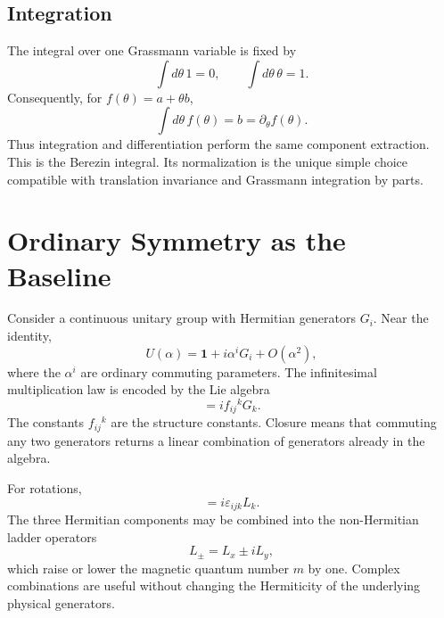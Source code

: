 \subsection{Integration}

The integral over one Grassmann variable is fixed by
\begin{equation}
\int d\theta\,1=0,
\qquad
\int d\theta\,\theta=1.
\end{equation}
Consequently, for \(f(\theta)=a+\theta b\),
\begin{equation}
\int d\theta\,f(\theta)=b=\partial_\theta f(\theta).
\end{equation}
Thus integration and differentiation perform the same component extraction. This is the Berezin integral. Its normalization is the unique simple choice compatible with translation invariance and Grassmann integration by parts. 

\section{Ordinary Symmetry as the Baseline}

Consider a continuous unitary group with Hermitian generators \(G_i\). Near the identity,
\begin{equation}
U(\alpha)=\mathbf 1+i\alpha^iG_i+O(\alpha^2),
\end{equation}
where the \(\alpha^i\) are ordinary commuting parameters. The infinitesimal multiplication law is encoded by the Lie algebra
\begin{equation}
[G_i,G_j]=i f_{ij}{}^{k}G_k.
\end{equation}
The constants \(f_{ij}{}^k\) are the structure constants. Closure means that commuting any two generators returns a linear combination of generators already in the algebra.

For rotations,
\begin{equation}
[L_i,L_j]=i\varepsilon_{ijk}L_k.
\end{equation}
The three Hermitian components may be combined into the non-Hermitian ladder operators
\begin{equation}
L_\pm=L_x\pm iL_y,
\end{equation}
which raise or lower the magnetic quantum number \(m\) by one. Complex combinations are useful without changing the Hermiticity of the underlying physical generators.

